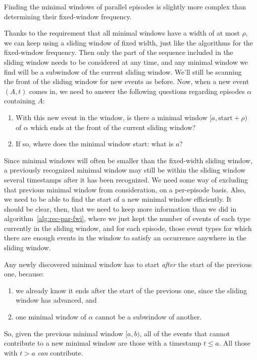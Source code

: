 Finding the minimal windows of parallel episodes is slightly more complex than determining their fixed-window frequency.

Thanks to the requirement that all minimal windows have a width of at most $ \rho $, we can keep using a sliding window of fixed width, just like the algorithms for the fixed-window frequency. Then only the part of the sequence included in the sliding window needs to be considered at any time, and any minimal window we find will be a subwindow of the current sliding window. We'll still be scanning the front of the sliding window for new events as before. Now, when a new event $ (A, t) $ comes in, we need to answer the following questions regarding episodes $ \alpha $ containing $ A $:
\begin{enumerate}
\item With this new event in the window, is there a minimal window $ [a, \text{start} + \rho) $ of $ \alpha $ which ends at the front of the current sliding window?
\item If so, where does the minimal window start: what is $ a $?
\end{enumerate}

Since minimal windows will often be smaller than the fixed-width sliding window, a previously recognized minimal window may still be within the sliding window several timestamps after it has been recognized. We need some way of excluding that previous minimal window from consideration, on a per-episode basis. Also, we need to be able to find the start of a new minimal window efficiently. It should be clear, then, that we need to keep more information than we did in algorithm~\ref{alg:rec-par-fwi}, where we just kept the number of events of each type currently in the sliding window, and for each episode, those event types for which there are enough events in the window to satisfy an occurrence anywhere in the sliding window.

Any newly discovered minimal window has to start \emph{after} the start of the previous one, because:
\begin{enumerate}
\item we already know it ends after the start of the previous one, since the sliding window has advanced, and
\item one minimal window of $ \alpha $ cannot be a subwindow of another.
\end{enumerate}

So, given the previous minimal window $ [a, b) $, all of the events that cannot contribute to a new minimal window are those with a timestamp $ t \leq a $. All those with $ t > a $ \emph{can} contribute.

